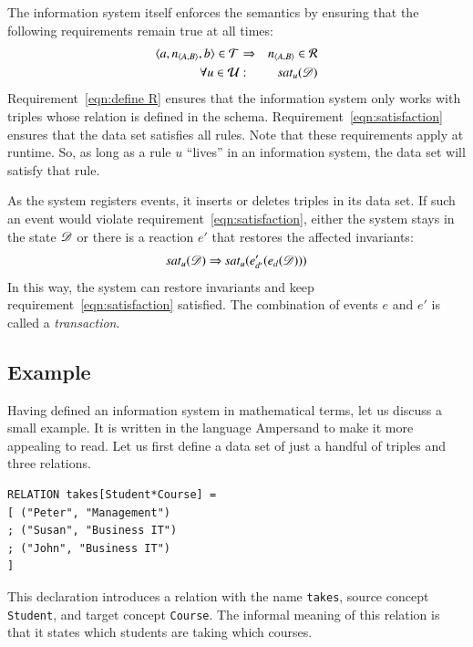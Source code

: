 \documentclass{elsarticle}
\begin{document}
   The information system itself enforces the semantics by ensuring that the following requirements remain true at all times:
\begin{eqnarray}
   \langle{a},{\text{\it n\/}_{\langle{A},{B}\rangle}},{b}\rangle\in\mathcal{T}&\Rightarrow&\text{\it n\/}_{\langle{A},{B}\rangle}\in\mathcal{R}
   \label{eqn:define R}\\
   \forall u\in\mathcal{U}&:&\text{\it sat\/}_{u}(\mathscr{D})
   \label{eqn:satisfaction}
\end{eqnarray}
   Requirement~\ref{eqn:define R} ensures that the information system only works with triples whose relation is defined in the schema.
   Requirement~\ref{eqn:satisfaction} ensures that the data set satisfies all rules.
   Note that these requirements apply at runtime.
   So, as long as a rule $u$ ``lives'' in an information system, the data set will satisfy that rule.

   As the system registers events, it inserts or deletes triples in its data set.
   If such an event would violate requirement~\ref{eqn:satisfaction},
   either the system stays in the state $\mathscr{D}$ or there is a reaction $e'$ that restores the affected invariants:
\begin{equation}
   \text{\it sat\/}_{u}(\mathscr{D})\Rightarrow\text{\it sat\/}_{u}(e'_{d'}(e_{d}(\mathscr{D})))
   \label{eqn:restoring}
\end{equation}
   In this way, the system can restore invariants and keep requirement~\ref{eqn:satisfaction} satisfied.
   The combination of events $e$ and $e'$ is called a {\em transaction}.

\subsection{Example}
\label{sct:Example existing IS}
   Having defined an information system in mathematical terms, let us discuss a small example.
   It is written in the language Ampersand to make it more appealing to read.
   Let us first define a data set of just a handful of triples and three relations.
\begin{verbatim}
RELATION takes[Student*Course] =
[ ("Peter", "Management")
; ("Susan", "Business IT")
; ("John", "Business IT")
]
\end{verbatim}
   This declaration introduces a relation with the name \verb#takes#,
   source concept \verb#Student#, and
   target concept \verb#Course#.
   The informal meaning of this relation is that it states which students are taking which courses.
\end{document}
